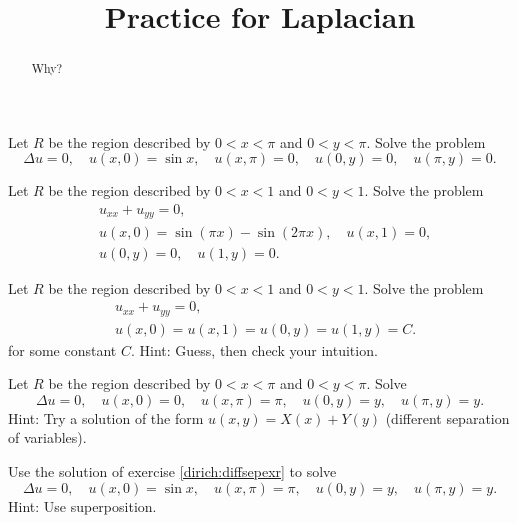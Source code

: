 \documentclass{ximera}
\title{Practice for Laplacian}
\begin{document}
\begin{abstract}
Why?
\end{abstract}
\maketitle


\begin{exercise}
    Let $R$ be the region described by $0 < x < \pi$ and $0 < y < \pi$. Solve the problem
    \begin{equation*}
        \Delta u = 0, \quad u(x,0) = \sin x, \quad u(x,\pi) = 0, \quad u(0,y) = 0,  \quad u(\pi,y) = 0 .
    \end{equation*}
\end{exercise}

\begin{exercise}
    Let $R$ be the region described by $0 < x < 1$ and $0 < y < 1$. Solve the problem
    \begin{align*}
        & u_{xx} + u_{yy} = 0, \\
        & u(x,0) = \sin (\pi x) - \sin (2\pi x), \quad u(x,1) = 0, \\
        & u(0,y) = 0, \quad u(1,y) = 0 .
    \end{align*}
\end{exercise}

\begin{exercise}
    Let $R$ be the region described by $0 < x < 1$ and $0 < y < 1$. Solve the problem
    \begin{align*}
        & u_{xx} + u_{yy} = 0, \\
        & u(x,0) = u(x,1) = u(0,y) = u(1,y) = C .
    \end{align*}
    for some constant $C$.  Hint: Guess, then check your intuition.
\end{exercise}

\begin{exercise} \label{dirich:diffsepexr}
    Let $R$ be the region described by $0 < x < \pi$ and $0 < y < \pi$. Solve
    \begin{equation*}
        \Delta u = 0, \quad u(x,0) = 0,\quad u(x,\pi) = \pi, \quad u(0,y) = y,\quad u(\pi,y) = y .
    \end{equation*}
    Hint: Try a solution of the form $u(x,y) = X(x) + Y(y)$ (different separation of variables).
\end{exercise}

\begin{exercise}
    Use the solution of exercise \ref{dirich:diffsepexr} to solve
    \begin{equation*}
        \Delta u = 0, \quad u(x,0) = \sin x, \quad u(x,\pi) = \pi, \quad u(0,y) = y, \quad u(\pi,y) = y .
    \end{equation*}
    Hint: Use superposition.
\end{exercise}
\end{document}
